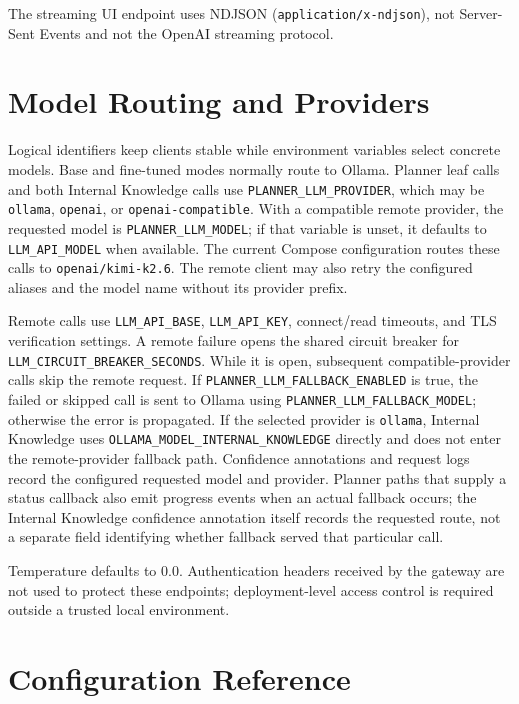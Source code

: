 \documentclass[11pt,a4paper]{article}
\newcommand{\code}[1]{\texttt{#1}}
\begin{document}
The streaming UI endpoint uses NDJSON (\code{application/x-ndjson}), not
Server-Sent Events and not the OpenAI streaming protocol.

\section{Model Routing and Providers}

Logical identifiers keep clients stable while environment variables select
concrete models. Base and fine-tuned modes normally route to Ollama. Planner
leaf calls and both Internal Knowledge calls use
\code{PLANNER\_LLM\_PROVIDER}, which may be \code{ollama}, \code{openai}, or
\code{openai-compatible}. With a compatible remote provider, the requested
model is \code{PLANNER\_LLM\_MODEL}; if that variable is unset, it defaults to
\code{LLM\_API\_MODEL} when available. The current Compose configuration routes
these calls to \code{openai/kimi-k2.6}. The remote client may also retry the
configured aliases and the model name without its provider prefix.

Remote calls use \code{LLM\_API\_BASE}, \code{LLM\_API\_KEY}, connect/read
timeouts, and TLS verification settings. A remote failure opens the shared
circuit breaker for \code{LLM\_CIRCUIT\_BREAKER\_SECONDS}. While it is open,
subsequent compatible-provider calls skip the remote request. If
\code{PLANNER\_LLM\_FALLBACK\_ENABLED} is true, the failed or skipped call is
sent to Ollama using \code{PLANNER\_LLM\_FALLBACK\_MODEL}; otherwise the error
is propagated. If the selected provider is \code{ollama}, Internal Knowledge
uses \code{OLLAMA\_MODEL\_INTERNAL\_KNOWLEDGE} directly and does not enter the
remote-provider fallback path. Confidence annotations and request logs record
the configured requested model and provider. Planner paths that supply a status
callback also emit progress events when an actual fallback occurs; the Internal
Knowledge confidence annotation itself records the requested route, not a
separate field identifying whether fallback served that particular call.

Temperature defaults to $0.0$. Authentication headers received by the gateway are
not used to protect these endpoints; deployment-level access control is required
outside a trusted local environment.

\section{Configuration Reference}
\end{document}
